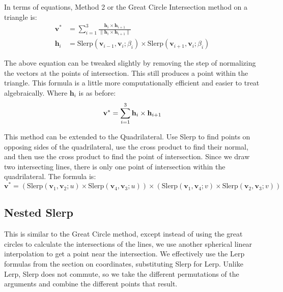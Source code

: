 \documentclass{amsart}[12pt]
\begin{document}
In terms of equations, Method 2 or the Great Circle Intersection method on a triangle is:
\begin{equation}\begin{split}
\mathbf v^* & = \sum^3_{i=1} \frac{\mathbf h_i \times \mathbf h_{i+1}}
{\|\mathbf h_i \times \mathbf h_{i+1}\|} \\
\mathbf h_i & =
\mathrm{Slerp}(\mathbf v_{i-1}, \mathbf v_i; \beta_{i})
\times
\mathrm{Slerp}(\mathbf v_{i+1}, \mathbf v_i; \beta_{i})
\end{split}\end{equation}

The above equation can be tweaked slightly by removing the step of normalizing the vectors at the points of intersection. This still produces a point within the triangle. This formula is a little more computationally efficient and easier to treat algebraically. Where $\mathbf h_i$ is as before:
\begin{equation}\label{eq:gct}
\mathbf v^* = \sum^3_{i=1} \mathbf h_i \times \mathbf h_{i+1} \\
\end{equation}

This method can be extended to the Quadrilateral. Use Slerp to find points on opposing sides of the quadrilateral, use the cross product to find their normal, and then use the cross product to find the point of intersection. Since we draw two intersecting lines, there is only one point of intersection within the quadrilateral. The formula is:
\begin{equation}\label{eq:gcq}
\mathbf v^* =
(\mathrm{Slerp}(\mathbf v_1, \mathbf v_2; u)
\times
\mathrm{Slerp}(\mathbf v_4, \mathbf v_3; u))
\times
(\mathrm{Slerp}(\mathbf v_1, \mathbf v_4; v)
\times
\mathrm{Slerp}(\mathbf v_2, \mathbf v_3; v))
\end{equation}

\subsection{Nested Slerp}
This is similar to the Great Circle method, except instead of using the great
circles to calculate the intersections of the lines, we use another spherical
linear interpolation to get a point near the intersection. We effectively use
the Lerp formulas from the section on coordinates, substituting Slerp for Lerp.
Unlike Lerp, Slerp does not commute, so we take the different permutations of
the arguments and combine the different points that result.
\end{document}
